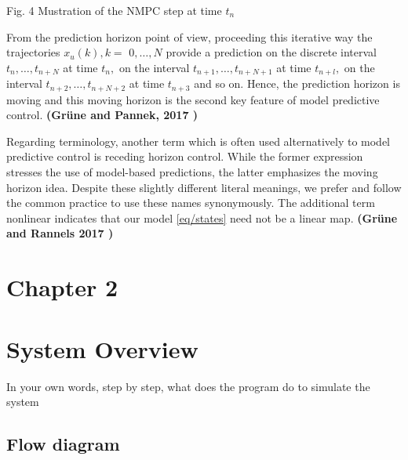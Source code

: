 \documentclass{UoNMCHA}
\numberwithin{equation}{section}
\begin{document}
	Fig. 4 Mustration of the NMPC step at time $t_{n}$
	
	From the prediction horizon point of view, proceeding this iterative way the trajectories $x_{u}(k), k=$
	$0, \ldots, N$ provide a prediction on the discrete interval $t_{n}, \ldots, t_{n+N}$ at time $t_{n},$ on the interval
	$t_{n+1}, \ldots, t_{n+N+1}$ at time $t_{n+l},$ on the interval $t_{n+2}, \ldots, t_{n+N+2}$ at time $t_{n+3}$ and so on. Hence, the
	prediction horizon is moving and this moving horizon is the second key feature of model predictive
	control. \textbf{(Grüne and Pannek, 2017 )}
	
	Regarding terminology, another term which is often used alternatively to model predictive control is
	receding horizon control. While the former expression stresses the use of model-based predictions, the
	latter emphasizes the moving horizon idea. Despite these slightly different literal meanings, we prefer
	and follow the common practice to use these names synonymously. The additional term nonlinear
	indicates that our model \ref{eq/states} need not be a linear map. \textbf{(Grüne and Rannels 2017 )}
	
	\newpage
	\section*{Chapter 2}
	\section{System Overview}
	In your own words, step by step, what does the program do to simulate the system
	
	\subsection{Flow diagram}
	
\end{document}
